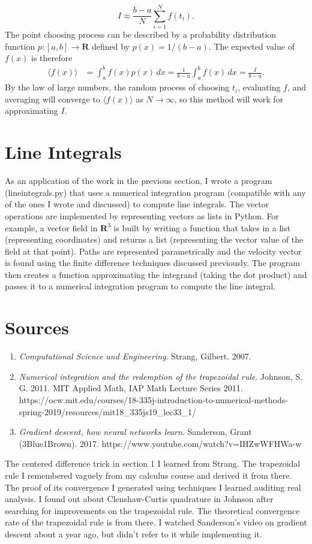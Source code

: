 \documentclass[11pt]{article}
\theoremstyle{plain}
\begin{document}
\begin{equation*}
	I \approx \frac{b-a}{N} \sum_{i=1}^N f(t_i).
\end{equation*}
The point choosing process can be described by a probability distribution function $p:[a,b]\to \mathbf{R}$ defined by $p(x) = 1/(b-a)$. The expected value of $f(x)$ is therefore 
\begin{align*}
	\langle f(x)\rangle &= \int_a^b f(x) p(x)\, dx = \frac{1}{b-a}\int_a^b f(x)\, dx = \frac{I}{b-a}.
\end{align*}
By the law of large numbers, the random process of choosing $t_i$, evaluating $f$, and averaging will converge to $\langle f(x)\rangle$ as $N\to\infty$, so this method will work for approximating $I$.
\section{Line Integrals}
As an application of the work in the previous section, I wrote a program (lineintegrals.py) that uses a numerical integration program (compatible with any of the ones I wrote and discussed) to compute line integrals. The vector operations are implemented by representing vectors as lists in Python. For example, a vector field in $\mathbf{R}^3$ is built by writing a function that takes in a list (representing coordinates) and returns a list (representing the vector value of the field at that point). Paths are represented parametrically and the velocity vector is found using the finite difference techniques discussed previously. The program then creates a function approximating the integrand (taking the dot product) and passes it to a numerical integration program to compute the line integral.
\section{Sources}
\begin{enumerate}
	\item \emph{Computational Science and Engineering}. Strang, Gilbert. 2007.
	\item \emph{Numerical integration and the redemption of the trapezoidal rule}. Johnson, S. G. 2011. MIT Applied Math, IAP Math Lecture Series 2011. https://ocw.mit.edu/courses/18-335j-introduction-to-numerical-methods-spring-2019/resources/mit18\_335js19\_lec33\_1/
	\item \emph{Gradient descent, how neural networks learn}. Sanderson, Grant (3Blue1Brown). 2017. https://www.youtube.com/watch?v=IHZwWFHWa-w
\end{enumerate}
The centered difference trick in section 1 I learned from Strang. The trapezoidal rule I remembered vaguely from my calculus course and derived it from there. The proof of its convergence I generated using techniques I learned auditing real analysis. I found out about Clenshaw-Curtis quadrature in Johnson after searching for improvements on the trapezoidal rule. The theoretical convergence rate of the trapezoidal rule is from there. I watched Sanderson's video on gradient descent about a year ago, but didn't refer to it while implementing it.
\end{document}

